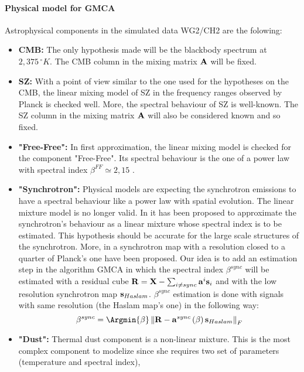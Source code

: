 \paragraph*{Physical model for GMCA}

Astrophysical components in the simulated data WG2/CH2 are the folowing:\\
\begin{itemize}
\item {\bf CMB:} The only hypothesis made will be the blackbody spectrum at $2,375\,^\circ K$. The CMB column in the mixing matrix $\bf A$ will be fixed.
\item {\bf SZ:} With a point of view similar to the one used for the hypotheses on the CMB, the linear mixing model of SZ in the frequency ranges observed by Planck is checked well. 
More, the spectral behaviour of SZ is well-known. The SZ column in the mixing matrix $\bf A$ will also be considered known and so fixed.
\item {\bf "Free-Free":} In first approximation, the linear mixing model is checked for the component "Free-Free". Its spectral behaviour is the one of a power law with 
spectral index $\beta^{FF} \simeq 2,15$ \citep{Delabrouille:2005dn}.
\item {\bf "Synchrotron":} Physical models are expecting the synchrotron emissions to have a spectral behaviour like a power law with spatial evolution. The linear mixture model 
is no longer valid. In \citep{Bonaldi:2006fu} it has been proposed to approximate the synchrotron's behaviour as a linear mixture whose spectral index is to be estimated. This hypothesis 
should be accurate for the large scale structures of the synchrotron. More, in \citep{Haslam:1982dk} a synchrotron map with a resolution closed to a quarter of Planck's one have been proposed. 
Our idea is to add an estimation step in the algorithm GMCA in which the spectral index $\beta^{sync}$ will be estimated with a residual cube ${\bf R} = {\bf X} - \sum_{i \neq sync} {\bf a}^i {\bf s}_i$ 
and with the low resolution synchrotron map ${\bf s}_{Haslam}$. $\beta^{sync}$ estimation is done with signals with same resolution (the Haslam map's one) in the following way:
\begin{equation}
\beta^{sync} = \Argmin{\beta} \left\|{\bf R} - {\bf a}^{sync}\left(\beta\right) {\bf s}_{Haslam} \right\|_F
\end{equation}
\item {\bf "Dust":} Thermal dust component is a non-linear mixture. This is the most complex component to modelize since she requires two set of parameters (temperature and spectral index), 

\end{itemize}
